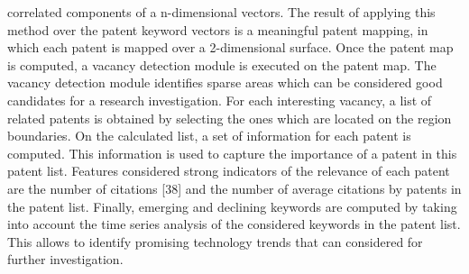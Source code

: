 \documentclass[]{book}
\begin{document}
correlated components of a n-dimensional vectors. The result of applying
this method over the patent keyword vectors is a meaningful patent
mapping, in which each patent is mapped over a 2-dimensional surface.
Once the patent map is computed, a vacancy detection module is executed
on the patent map. The vacancy detection module identifies sparse areas
which can be considered good candidates for a research investigation.
For each interesting vacancy, a list of related patents is obtained by
selecting the ones which are located on the region boundaries. On the
calculated list, a set of information for each patent is computed. This
information is used to capture the importance of a patent in this patent
list. Features considered strong indicators of the relevance of each
patent are the number of citations {[}38{]} and the number of average
citations by patents in the patent list. Finally, emerging and declining
keywords are computed by taking into account the time series analysis of
the considered keywords in the patent list. This allows to identify
promising technology trends that can considered for further
investigation.
\end{document}
